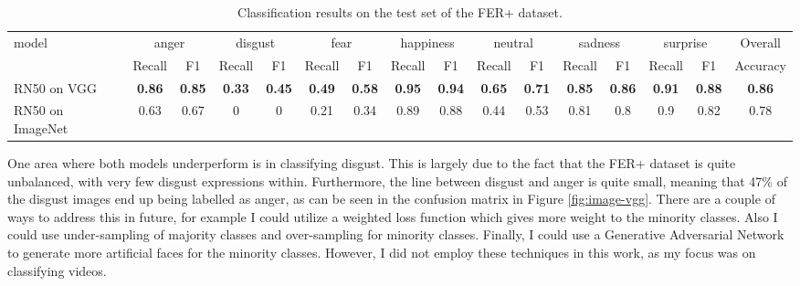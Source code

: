 \documentclass[sigconf]{acmart}
\begin{document}
{\begin{table}[]
\caption{Classification results on the test set of the FER+ dataset.}
\label{tab:imageres}
\begin{tabular}{lccccccccccccccc}
\multirow{2}{*}{model} & \multicolumn{2}{c}{anger} &
\multicolumn{2}{c}{disgust} & \multicolumn{2}{c}{fear} &
\multicolumn{2}{c}{happiness} & \multicolumn{2}{c}{neutral} &
\multicolumn{2}{c}{sadness} & \multicolumn{2}{c}{surprise}  & Overall\\ \cline{2-16}
                       & Recall        & F1        
		       & Recall        & F1        & Recall        & F1
		       &  Recall        & F1        &  Recall        & F1
		       & Recall        & F1        & Recall        & F1    &
		       Accuracy    \\ \hline
RN50 on VGG & \textbf{0.86} &\textbf{0.85} &\textbf{0.33} &\textbf{0.45} &\textbf{0.49} &\textbf{0.58} &\textbf{0.95} &\textbf{0.94} &\textbf{0.65} &\textbf{0.71} &\textbf{0.85} &\textbf{0.86} &\textbf{0.91} &\textbf{0.88} &\textbf{0.86} \\
RN50 on ImageNet   & 0.63 &0.67 &0 &0 &0.21 &0.34 &0.89 &0.88 &0.44 &0.53 &0.81 &0.8 &0.9 &0.82 &0.78 \\
\end{tabular}
\end{table}

One area where both models underperform is in classifying disgust. This is largely
due to the fact that the FER+ dataset is quite unbalanced, with very few
disgust expressions within. Furthermore, the line between disgust and anger is
quite small, meaning that 47\% of the disgust images end up being labelled as
anger,
as can be seen in the confusion matrix in Figure \ref{fig:image-vgg}. There
are a couple of ways to address this in future, for example I could utilize a
weighted loss function which gives more weight to the minority
classes. Also I could use under-sampling of majority classes and over-sampling
for minority classes. Finally, I could use a Generative
Adversarial Network to generate more artificial faces for the minority
classes. However, I did not employ these techniques in this work, as my focus
was on classifying videos.

}
\end{document}
